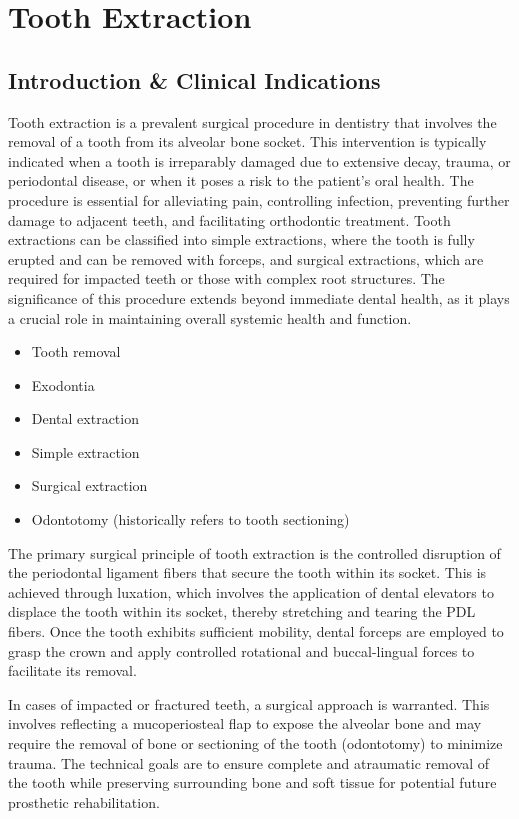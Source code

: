 \chapter{Tooth Extraction}

\section*{Introduction \& Clinical Indications}
Tooth extraction is a prevalent surgical procedure in dentistry that involves the removal of a tooth from its alveolar bone socket. This intervention is typically indicated when a tooth is irreparably damaged due to extensive decay, trauma, or periodontal disease, or when it poses a risk to the patient's oral health. The procedure is essential for alleviating pain, controlling infection, preventing further damage to adjacent teeth, and facilitating orthodontic treatment. Tooth extractions can be classified into simple extractions, where the tooth is fully erupted and can be removed with forceps, and surgical extractions, which are required for impacted teeth or those with complex root structures. The significance of this procedure extends beyond immediate dental health, as it plays a crucial role in maintaining overall systemic health and function.

\begin{itemize}
  \item Tooth removal
  \item Exodontia
  \item Dental extraction
  \item Simple extraction
  \item Surgical extraction
  \item Odontotomy (historically refers to tooth sectioning)
\end{itemize}

The primary surgical principle of tooth extraction is the controlled disruption of the periodontal ligament fibers that secure the tooth within its socket. This is achieved through luxation, which involves the application of dental elevators to displace the tooth within its socket, thereby stretching and tearing the PDL fibers. Once the tooth exhibits sufficient mobility, dental forceps are employed to grasp the crown and apply controlled rotational and buccal-lingual forces to facilitate its removal.

In cases of impacted or fractured teeth, a surgical approach is warranted. This involves reflecting a mucoperiosteal flap to expose the alveolar bone and may require the removal of bone or sectioning of the tooth (odontotomy) to minimize trauma. The technical goals are to ensure complete and atraumatic removal of the tooth while preserving surrounding bone and soft tissue for potential future prosthetic rehabilitation.

